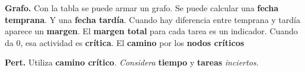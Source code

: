 \documentclass{article}
\begin{document}
\textbf{Grafo.} Con la tabla se puede armar un grafo.
Se puede calcular una \textbf{fecha temprana}.
Y una \textbf{fecha tardía}.
Cuando hay diferencia entre temprana y tardía aparece un \textbf{margen}.
El \textbf{margen total} para cada tarea es un indicador.
Cuando da 0, esa actividad es \textbf{crítica}.
El \textbf{camino} por los \textbf{nodos críticos}

\textbf{Pert.}
Utiliza \textbf{camino crítico}.
\textit{Considera} \textbf{tiempo} y \textbf{tareas} \textit{inciertos}.
\end{document}
